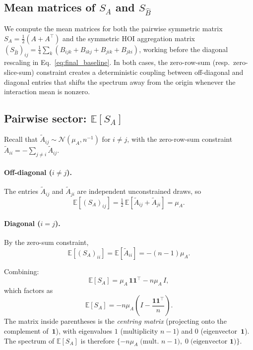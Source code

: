 \documentclass[pdflatex,sn-mathphys-num]{sn-jnl}%
\begin{document}
\begin{appendices}
\section{Mean matrices of $S_A$ and $S_{\hat{B}}$}\label{sec:rmt_mean}

We compute the mean matrices for both the pairwise symmetric matrix $S_A = \tfrac{1}{2}(A + A^\top)$ and the symmetric HOI aggregation matrix $(S_{\hat{B}})_{ij} = \tfrac{1}{4}\sum_k(B_{ijk} + B_{ikj} + B_{jik} + B_{jki})$, working before the diagonal rescaling in Eq.~\eqref{eq:final_baseline}. In both cases, the zero-row-sum (resp.\ zero-slice-sum) constraint creates a deterministic coupling between off-diagonal and diagonal entries that shifts the spectrum away from the origin whenever the interaction mean is nonzero.

\subsection*{Pairwise sector: $\mathbb{E}[S_A]$}

Recall that $\tilde{A}_{ij} \sim \mathcal{N}(\mu_A, n^{-1})$ for $i \neq j$, with the zero-row-sum constraint $\tilde{A}_{ii} = -\sum_{j \neq i} \tilde{A}_{ij}$.

\paragraph{Off-diagonal ($i \neq j$).} The entries $\tilde{A}_{ij}$ and $\tilde{A}_{ji}$ are independent unconstrained draws, so
\[
\mathbb{E}[(S_A)_{ij}] = \tfrac{1}{2}\,\mathbb{E}[\tilde{A}_{ij} + \tilde{A}_{ji}] = \mu_A.
\]

\paragraph{Diagonal ($i = j$).} By the zero-sum constraint,
\[
\mathbb{E}[(S_A)_{ii}] = \mathbb{E}[\tilde{A}_{ii}] = -(n-1)\mu_A.
\]

Combining:
\[
\mathbb{E}[S_A] = \mu_A\,\mathbf{1}\mathbf{1}^\top - n\mu_A\,I,
\]
which factors as
\begin{equation}\label{eq:mean_SA}
\mathbb{E}[S_A] = -n\mu_A\!\left(I - \frac{\mathbf{1}\mathbf{1}^\top}{n}\right).
\end{equation}
The matrix inside parentheses is the \emph{centring matrix} (projecting onto the complement of~$\mathbf{1}$), with eigenvalues $1$ (multiplicity $n{-}1$) and $0$ (eigenvector~$\mathbf{1}$). The spectrum of $\mathbb{E}[S_A]$ is therefore $\{-n\mu_A\;\text{(mult.\ }n{-}1),\;0\;\text{(eigenvector~}\mathbf{1})\}$.


\end{appendices}
\end{document}
